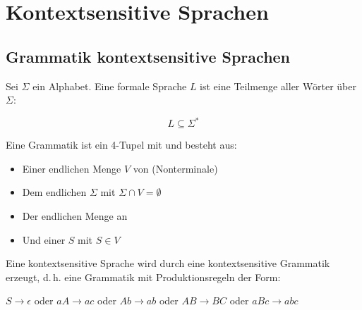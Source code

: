 \documentclass{lehramt-informatik-haupt}
\begin{document}

\chapter{Kontextsensitive Sprachen}

\begin{liQuellen}
\item \cite[Seite 191-192]{hoffmann}
\end{liQuellen}

%

\section{Grammatik kontextsensitive Sprachen}

Sei $\Sigma$ ein Alphabet. Eine formale Sprache $L$ ist eine Teilmenge
aller Wörter über $\Sigma$:

\begin{displaymath}
L \subseteq \Sigma^*
\end{displaymath}

\bigskip

\noindent
Eine Grammatik ist ein 4-Tupel mit \liGrammatik{} und besteht aus:

\begin{itemize}
\item Einer endlichen Menge $V$ von  (Nonterminale)

\item Dem endlichen  $\Sigma$ mit $\Sigma \cap V
= \emptyset$

\item Der endlichen Menge an 

\item Und einer  $S$ mit $S \in V$
\end{itemize}

Eine kontextsensitive Sprache wird durch eine kontextsensitive
Grammatik erzeugt, d.\,h. eine Grammatik mit Produktionsregeln der
Form:

$S \rightarrow \epsilon$ oder
$aA \rightarrow ac$ oder
$Ab \rightarrow ab$ oder
$AB \rightarrow BC$ oder
$aBc \rightarrow abc$
\end{document}
